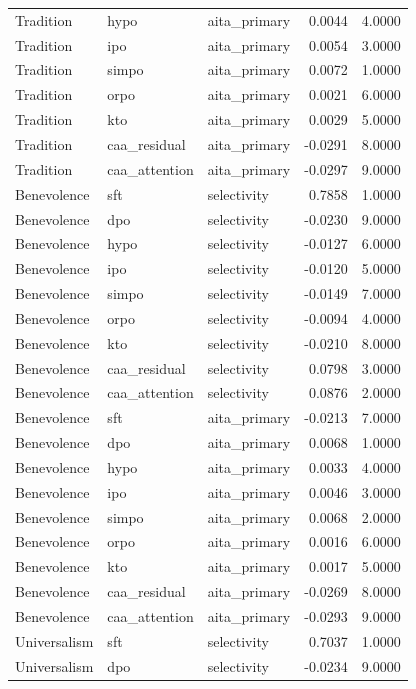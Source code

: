 \begin{tabular}{lllrr}
Tradition & hypo & aita\_primary & 0.0044 & 4.0000 \\
Tradition & ipo & aita\_primary & 0.0054 & 3.0000 \\
Tradition & simpo & aita\_primary & 0.0072 & 1.0000 \\
Tradition & orpo & aita\_primary & 0.0021 & 6.0000 \\
Tradition & kto & aita\_primary & 0.0029 & 5.0000 \\
Tradition & caa\_residual & aita\_primary & -0.0291 & 8.0000 \\
Tradition & caa\_attention & aita\_primary & -0.0297 & 9.0000 \\
Benevolence & sft & selectivity & 0.7858 & 1.0000 \\
Benevolence & dpo & selectivity & -0.0230 & 9.0000 \\
Benevolence & hypo & selectivity & -0.0127 & 6.0000 \\
Benevolence & ipo & selectivity & -0.0120 & 5.0000 \\
Benevolence & simpo & selectivity & -0.0149 & 7.0000 \\
Benevolence & orpo & selectivity & -0.0094 & 4.0000 \\
Benevolence & kto & selectivity & -0.0210 & 8.0000 \\
Benevolence & caa\_residual & selectivity & 0.0798 & 3.0000 \\
Benevolence & caa\_attention & selectivity & 0.0876 & 2.0000 \\
Benevolence & sft & aita\_primary & -0.0213 & 7.0000 \\
Benevolence & dpo & aita\_primary & 0.0068 & 1.0000 \\
Benevolence & hypo & aita\_primary & 0.0033 & 4.0000 \\
Benevolence & ipo & aita\_primary & 0.0046 & 3.0000 \\
Benevolence & simpo & aita\_primary & 0.0068 & 2.0000 \\
Benevolence & orpo & aita\_primary & 0.0016 & 6.0000 \\
Benevolence & kto & aita\_primary & 0.0017 & 5.0000 \\
Benevolence & caa\_residual & aita\_primary & -0.0269 & 8.0000 \\
Benevolence & caa\_attention & aita\_primary & -0.0293 & 9.0000 \\
Universalism & sft & selectivity & 0.7037 & 1.0000 \\
Universalism & dpo & selectivity & -0.0234 & 9.0000 \\

\end{tabular}
